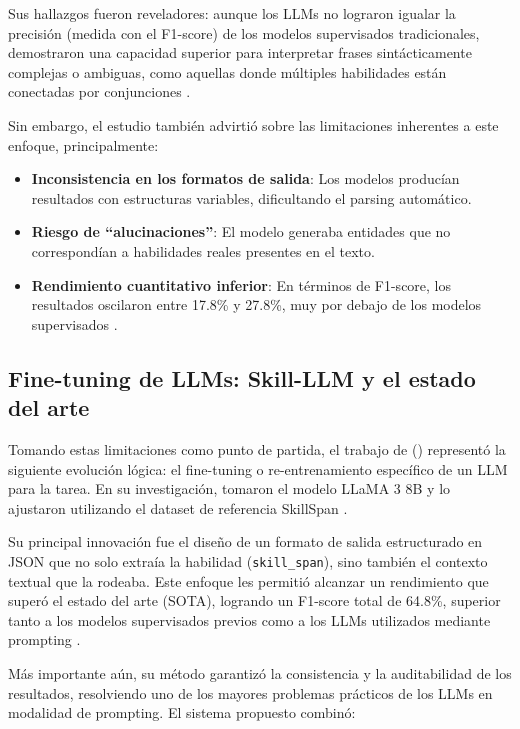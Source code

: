 Sus hallazgos fueron reveladores: aunque los LLMs no lograron igualar la precisión (medida con el F1-score) de los modelos supervisados tradicionales, demostraron una capacidad superior para interpretar frases sintácticamente complejas o ambiguas, como aquellas donde múltiples habilidades están conectadas por conjunciones \parencite{nguyen2024}.

Sin embargo, el estudio también advirtió sobre las limitaciones inherentes a este enfoque, principalmente:

\begin{itemize}
    \item \textbf{Inconsistencia en los formatos de salida}: Los modelos producían resultados con estructuras variables, dificultando el parsing automático.
    \item \textbf{Riesgo de ``alucinaciones''}: El modelo generaba entidades que no correspondían a habilidades reales presentes en el texto.
    \item \textbf{Rendimiento cuantitativo inferior}: En términos de F1-score, los resultados oscilaron entre 17.8\% y 27.8\%, muy por debajo de los modelos supervisados \parencite{nguyen2024}.
\end{itemize}

\subsection{Fine-tuning de LLMs: Skill-LLM y el estado del arte}

Tomando estas limitaciones como punto de partida, el trabajo de \citeauthor{herandi2024} (\citeyear{herandi2024}) representó la siguiente evolución lógica: el fine-tuning o re-entrenamiento específico de un LLM para la tarea. En su investigación, tomaron el modelo LLaMA 3 8B y lo ajustaron utilizando el dataset de referencia SkillSpan \parencite{zhang2022}.

Su principal innovación fue el diseño de un formato de salida estructurado en JSON que no solo extraía la habilidad (\texttt{skill\_span}), sino también el contexto textual que la rodeaba. Este enfoque les permitió alcanzar un rendimiento que superó el estado del arte (SOTA), logrando un F1-score total de 64.8\%, superior tanto a los modelos supervisados previos como a los LLMs utilizados mediante prompting \parencite{herandi2024}.

Más importante aún, su método garantizó la consistencia y la auditabilidad de los resultados, resolviendo uno de los mayores problemas prácticos de los LLMs en modalidad de prompting. El sistema propuesto combinó:

